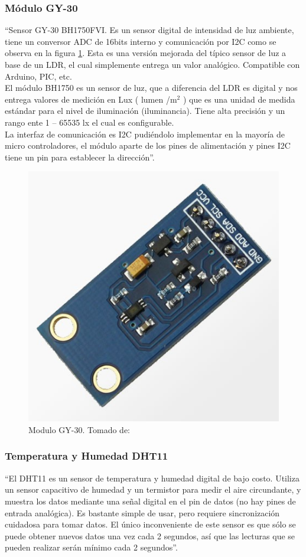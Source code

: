 \subsubsection{Módulo GY-30}

``Sensor GY-30 BH1750FVI. Es un sensor digital de intensidad de luz ambiente, tiene un conversor ADC de 16bits interno y comunicación por I2C como se observa en la figura \ref{fig:gy-30}. Esta es una versión mejorada del típico sensor de luz a base de un LDR, el cual simplemente entrega un valor analógico. Compatible con Arduino, PIC, etc. \\

El módulo BH1750 es un sensor de luz, que a diferencia del LDR es digital y nos entrega valores de medición en Lux ( lumen /m$^2$ ) que es una  unidad de medida estándar para el nivel de iluminación (iluminancia). Tiene alta precisión y un rango ente 1 – 65535 lx el cual es configurable.\\

La interfaz de comunicación es I2C pudiéndolo implementar en la mayoría de micro controladores, el módulo aparte de los pines de alimentación y pines I2C tiene un pin para establecer la dirección''.\cite{GY30}

\begin{figure}[H]
	\centering
	\caption{Modulo GY-30. Tomado de: \cite{GY30}}
	\label{fig:gy-30}
	\includegraphics[width=0.4\linewidth]{Imagenes/gy-30}
\end{figure}

\subsubsection{Temperatura y Humedad DHT11}

``El DHT11 es un sensor de temperatura y humedad digital de bajo costo. Utiliza un sensor capacitivo de humedad y un termistor para medir el aire circundante, y muestra los datos mediante una señal digital en el pin de datos (no hay pines de entrada analógica). Es bastante simple de usar, pero requiere sincronización cuidadosa para tomar datos. El único inconveniente de este sensor es que sólo se puede obtener nuevos datos una vez cada 2 segundos, así que las lecturas que se pueden realizar serán mínimo cada 2 segundos''. \cite{DHT11}

